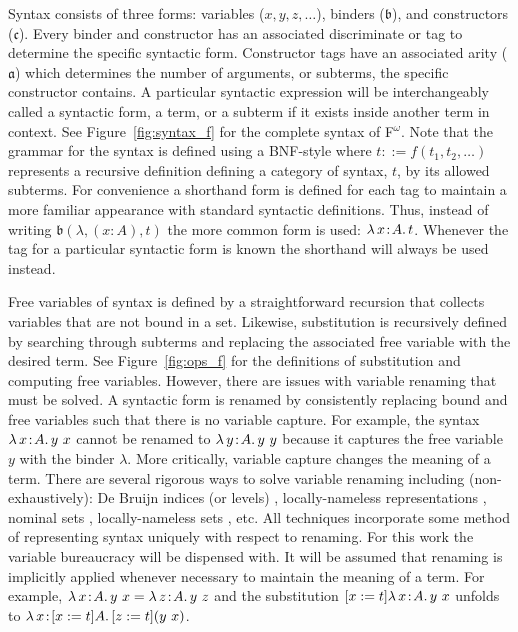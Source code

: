 

Syntax consists of three forms: variables ($x, y, z, \ldots$), binders ($\mathfrak{b}$), and constructors ($\mathfrak{c}$).
Every binder and constructor has an associated discriminate or tag to determine the specific syntactic form.
Constructor tags have an associated arity ($\mathfrak{a}$) which determines the number of arguments, or subterms, the specific constructor contains.
A particular syntactic expression will be interchangeably called a syntactic form, a term, or a subterm if it exists inside another term in context.
See Figure~\ref{fig:syntax_f} for the complete syntax of F$^\omega$.
Note that the grammar for the syntax is defined using a BNF-style \cite{floyd1961_bnf} where $t ::= f(t_1, t_2, \ldots)$ represents a recursive definition defining a category of syntax, $t$, by its allowed subterms.
For convenience a shorthand form is defined for each tag to maintain a more familiar appearance with standard syntactic definitions.
Thus, instead of writing $\mathfrak{b}(\lambda, (x : A), t)$ the more common form is used: ${\lambda}\, x\! : \! A.\, t$.
Whenever the tag for a particular syntactic form is known the shorthand will always be used instead.



Free variables of syntax is defined by a straightforward recursion that collects variables that are not bound in a set.
Likewise, substitution is recursively defined by searching through subterms and replacing the associated free variable with the desired term.
See Figure~\ref{fig:ops_f} for the definitions of substitution and computing free variables.
However, there are issues with variable renaming that must be solved.
A syntactic form is renamed by consistently replacing bound and free variables such that there is no variable capture.
For example, the syntax ${\lambda}\, x\! : \! A.\, y\ x$ cannot be renamed to ${\lambda}\, y\! : \! A.\, y\ y$ because it captures the free variable $y$ with the binder $\lambda$.
More critically, variable capture changes the meaning of a term.
There are several rigorous ways to solve variable renaming including (non-exhaustively): De Bruijn indices (or levels) \cite{debruijn1972}, locally-nameless representations \cite{chargueraud2012}, nominal sets \cite{pitts2013_nominal}, locally-nameless sets \cite{pitts2023_lns}, etc.
All techniques incorporate some method of representing syntax uniquely with respect to renaming.
For this work the variable bureaucracy will be dispensed with.
It will be assumed that renaming is implicitly applied whenever necessary to maintain the meaning of a term.
For example, $\abs{\lambda}{x}{A}{y\ x} = \abs{\lambda}{z}{A}{y\ z}$ and the substitution $[x := t]{\lambda}\, x\! : \! A.\, y\ x$ unfolds to $\abs{\lambda}{x}{[x := t]A}{[z := t](y\ x)}$.


